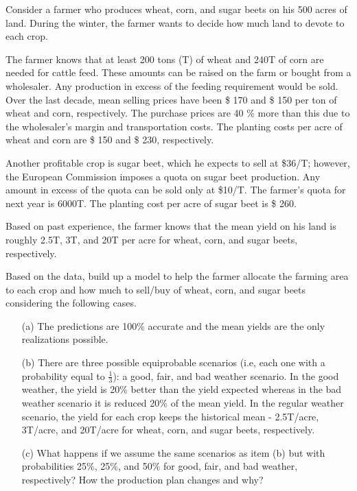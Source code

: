 Consider a farmer who produces wheat, corn, and sugar beets on his 500 acres of land. During the winter, the farmer wants to decide 
how much land to devote to each crop. 

The farmer knows that at least 200 tons (T) of wheat and 240T of corn are needed for cattle feed. 
These amounts can be raised on the farm or bought from a wholesaler. Any production in excess of the feeding requirement would be sold. Over the last decade, mean selling prices have been \$ 170 and \$ 150 per ton of wheat and corn, respectively. The purchase prices are 40 \% more than this due to the wholesaler's margin and transportation costs. The planting costs per acre of wheat and corn are \$ 150 and \$ 230, respectively.

Another profitable crop is sugar beet, which he expects to sell at \$36/T; however, the European Commission imposes a quota on sugar beet 
production. Any amount in excess of the quota can be sold only at \$10/T. The farmer’s quota for next year is 6000T. The planting cost per acre of sugar beet is \$ 260.

Based on past experience, the farmer knows that the mean yield on his land is
roughly 2.5T, 3T, and 20T per acre for wheat, corn, and sugar beets, respectively.

Based on the data, build up a model to help the farmer allocate the farming area to each crop and how much to sell/buy of wheat, corn, 
and sugar beets considering the following cases.

\begin{itemize}
	\item[(a)] The predictions are 100\% accurate and the mean yields are the only realizations possible.	
	\item[(b)] There are three possible equiprobable scenarios (i.e, each one with a probability equal to $\frac{1}{3}$): a good, fair, and bad weather scenario. In the good weather, the yield is 20\% better than the yield expected whereas in the bad weather scenario it is reduced 20\% of the mean yield. In the regular weather scenario, the yield for each crop keeps the historical mean - 2.5T/acre, 3T/acre, and 20T/acre for wheat, corn, and sugar beets, respectively.
	\item[(c)]	What happens if we assume the same scenarios as item (b) but with probabilities 25\%, 25\%, and 50\% for good, fair, and bad weather, respectively? How the production plan changes and why?	
\end{itemize}
